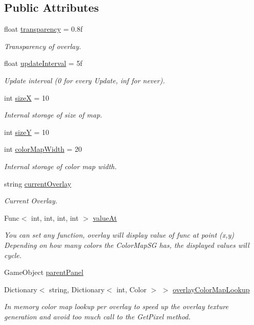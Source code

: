 \subsection*{Public Attributes}
\begin{DoxyCompactItemize}
\item 
float \hyperlink{class_overlay_map_ad6d2516e0f0bdaf19f8639191668e91f}{transparency} = 0.\+8f
\begin{DoxyCompactList}\small\item\em Transparency of overlay. \end{DoxyCompactList}\item 
float \hyperlink{class_overlay_map_a9fb8c6f87fac7a1010b382376cac3fd5}{update\+Interval} = 5f
\begin{DoxyCompactList}\small\item\em Update interval (0 for every Update, inf for never). \end{DoxyCompactList}\item 
int \hyperlink{class_overlay_map_a45e5684142986bdb03421c4cb5f6a102}{sizeX} = 10
\begin{DoxyCompactList}\small\item\em Internal storage of size of map. \end{DoxyCompactList}\item 
int \hyperlink{class_overlay_map_a41ca1be6bb50efb0ed8a8df74aabad96}{sizeY} = 10
\item 
int \hyperlink{class_overlay_map_a29e1d10e3cbdcc11c04526272997ba52}{color\+Map\+Width} = 20
\begin{DoxyCompactList}\small\item\em Internal storage of color map width. \end{DoxyCompactList}\item 
string \hyperlink{class_overlay_map_ac2b64793947ba88ca33ff3aab6c7ac21}{current\+Overlay}
\begin{DoxyCompactList}\small\item\em Current Overlay. \end{DoxyCompactList}\item 
Func$<$ int, int, int, int $>$ \hyperlink{class_overlay_map_a088245c64083beb9fe5f8c26e0c0d125}{value\+At}
\begin{DoxyCompactList}\small\item\em You can set any function, overlay will display value of func at point (x,y) Depending on how many colors the Color\+Map\+SG has, the displayed values will cycle. \end{DoxyCompactList}\item 
Game\+Object \hyperlink{class_overlay_map_a3fe567a59389478f427f4d558aec9112}{parent\+Panel}
\item 
Dictionary$<$ string, Dictionary$<$ int, Color $>$ $>$ \hyperlink{class_overlay_map_a99587c2f7fac62c96199e3980e9be0cb}{overlay\+Color\+Map\+Lookup}
\begin{DoxyCompactList}\small\item\em In memory color map lookup per overlay to speed up the overlay texture generation and avoid too much call to the Get\+Pixel method. \end{DoxyCompactList}\end{DoxyCompactItemize}
